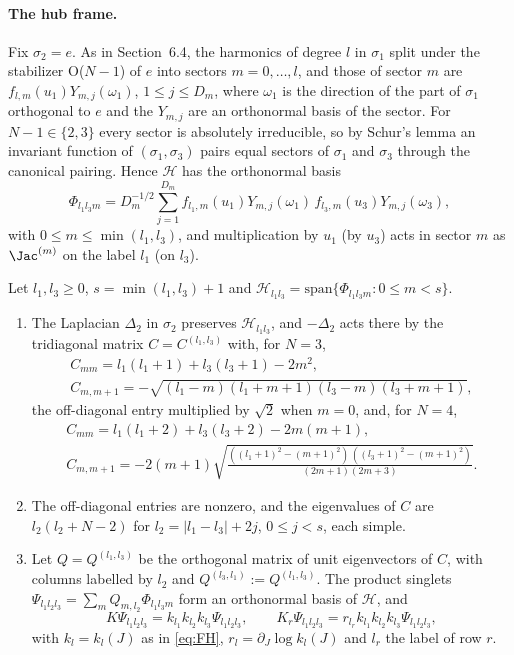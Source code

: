 \paragraph{The hub frame.}
Fix $\sigma_2=e$. As in Section~6.4, the harmonics of degree $l$ in $\sigma_1$ split under the stabilizer O($N-1$) of $e$ into sectors $m=0,\dots,l$, and
those of sector $m$ are $f_{l,m}(u_1)Y_{m,j}(\omega_1)$, $1\le j\le D_m$, where $\omega_1$ is the direction of the part of $\sigma_1$ orthogonal to $e$
and the $Y_{m,j}$ are an orthonormal basis of the sector. For $N-1\in\{2,3\}$ every sector is absolutely irreducible, so by Schur's lemma an invariant
function of $(\sigma_1,\sigma_3)$ pairs equal sectors of $\sigma_1$ and $\sigma_3$ through the canonical pairing. Hence $\mathcal H$ has the orthonormal
basis
\[
\Phi_{l_1l_3m}=D_m^{-1/2}\sum_{j=1}^{D_m}f_{l_1,m}(u_1)Y_{m,j}(\omega_1)\,f_{l_3,m}(u_3)Y_{m,j}(\omega_3),
\]
with $0\le m\le\min(l_1,l_3)$, and multiplication by $u_1$ (by $u_3$) acts in sector $m$ as $\Jac^{(m)}$ on the label $l_1$ (on $l_3$).

\begin{lemma}\label{lem:rhframe}
Let $l_1,l_3\ge0$, $s=\min(l_1,l_3)+1$ and $\mathcal H_{l_1l_3}=\mathrm{span}\{\Phi_{l_1l_3m}:0\le m<s\}$.
\begin{enumerate}
\item[(i)] The Laplacian $\Delta_2$ in $\sigma_2$ preserves $\mathcal H_{l_1l_3}$, and $-\Delta_2$ acts there by the tridiagonal matrix $C=C^{(l_1,l_3)}$
with, for $N=3$,
\begin{gather*}
C_{mm}=l_1(l_1+1)+l_3(l_3+1)-2m^2,\\
C_{m,m+1}=-\sqrt{(l_1-m)(l_1+m+1)(l_3-m)(l_3+m+1)},
\end{gather*}
the off-diagonal entry multiplied by $\sqrt2$ when $m=0$, and, for $N=4$,
\begin{gather*}
C_{mm}=l_1(l_1+2)+l_3(l_3+2)-2m(m+1),\\
C_{m,m+1}=-2(m+1)\sqrt{\frac{((l_1+1)^2-(m+1)^2)\,((l_3+1)^2-(m+1)^2)}{(2m+1)(2m+3)}}.
\end{gather*}
\item[(ii)] The off-diagonal entries are nonzero, and the eigenvalues of $C$ are $l_2(l_2+N-2)$ for $l_2=|l_1-l_3|+2j$, $0\le j<s$, each simple.
\item[(iii)] Let $Q=Q^{(l_1,l_3)}$ be the orthogonal matrix of unit eigenvectors of $C$, with columns labelled by $l_2$ and $Q^{(l_3,l_1)}:=Q^{(l_1,l_3)}$.
The product singlets $\Psi_{l_1l_2l_3}=\sum_mQ_{m,l_2}\Phi_{l_1l_3m}$ form an orthonormal basis of $\mathcal H$, and
\[
K\Psi_{l_1l_2l_3}=k_{l_1}k_{l_2}k_{l_3}\Psi_{l_1l_2l_3},\qquad K_r\Psi_{l_1l_2l_3}=r_{l_r}k_{l_1}k_{l_2}k_{l_3}\Psi_{l_1l_2l_3},
\]
with $k_l=k_l(J)$ as in \eqref{eq:FH}, $r_l=\partial_J\log k_l(J)$ and $l_r$ the label of row $r$.
\end{enumerate}
\end{lemma}

